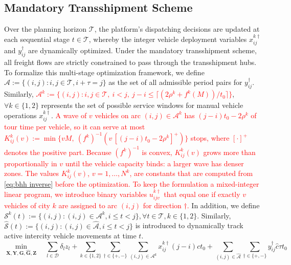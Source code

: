 \documentclass[10pt, reqno]{amsart}
\begin{document}
\subsection{Mandatory Transshipment Scheme}\label{subsec:mandatory}
Over the planning horizon $\mathcal{T}$, the platform's dispatching decisions are updated at each sequential stage $t \in \mathcal{T}$, whereby the integer vehicle deployment variables $x_{ij}^{k\dagger}$ and $y_{ij}^{\dagger}$ are dynamically optimized. Under the mandatory transshipment scheme, all freight flows are strictly constrained to pass through the transshipment hubs. To formalize this multi-stage optimization framework, we define $\hat{\mathcal{A}} := \{(i,j) : i,j \in \mathcal{T}, i+\tau=j\}$ as the set of all admissible period pairs for $y_{ij}^{\dagger}$. Similarly, \textcolor{red}{$\mathcal{A}^k := \{(i,j) : i,j \in \mathcal{T},\ i<j,\ j-i \le \lceil (2\rho^k+f^k(M))/t_0 \rceil\}$}, $\forall k \in \{1,2\}$ represents the set of possible service windows for manual vehicle operations $x_{ij}^{k\dagger}$. \textcolor{red}{A wave of $v$ vehicles on arc $(i,j)\in\mathcal{A}^k$ has $(j-i)t_0-2\rho^k$ of tour time per vehicle, so it can serve at most $K^k_{ij}(v) := \min\{vM,\ (f^k)^{-1}(v\,[(j-i)t_0-2\rho^k]^+)\}$ stops, where $[\cdot]^+$ denotes the positive part. Because $(f^k)^{-1}$ is convex, $K^k_{ij}(v)$ grows more than proportionally in $v$ until the vehicle capacity binds: a larger wave has denser zones. The values $K^k_{ij}(v)$, $v=1,\dots,N^k$, are constants that are computed from \eqref{eq:bhh inverse} before the optimization. To keep the formulation a mixed-integer linear program, we introduce binary variables $u^{k\dagger}_{ijv}$ that equal one if exactly $v$ vehicles of city $k$ are assigned to arc $(i,j)$ for direction $\dagger$.} In addition, we define $\mathcal{S}^k(t) := \{(i,j) : (i,j) \in \mathcal{A}^k, i \le t < j\}, \forall t \in \mathcal{T}, k \in \{1,2\}$. Similarly, $\hat{\mathcal{S}}(t) := \{(i,j) : (i,j) \in \hat{\mathcal{A}}, i \le t < j\}$ is introduced to dynamically track active intercity vehicle movements at time $t$.
\begin{equation}
\min_{\mathbf{X}, \mathbf{Y}, \mathbf{G}, \hat{\mathbf{G}}, \mathbf{Z}} \quad \sum_{l \in \mathcal{D}} \delta_l z_l + \sum_{k \in \{1,2\}} \sum_{\dagger \in \{+,-\}} \sum_{(i,j) \in \mathcal{A}^{k}} x_{ij}^{k\dagger} (j-i) c t_0 + \sum_{(i,j) \in \hat{\mathcal{A}}} \sum_{\dagger \in \{+,-\}} y_{ij}^{\dagger} \hat{c} \tau t_0\label{eq:obj}
\end{equation}
\end{document}
